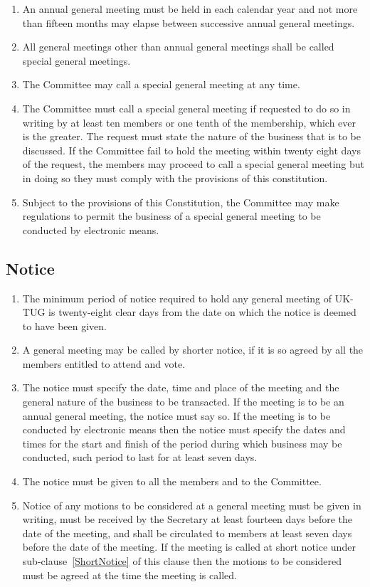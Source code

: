 \documentclass[a4paper,11pt]{article}
\begin{document}
\begin{enumerate}
\item An annual general meeting must be held in each calendar year and not
  more than fifteen months may elapse between successive annual general
  meetings.
\item All general meetings other than annual general meetings shall be called
  special general meetings.
\item The Committee may call a special general meeting at any time.
\item The Committee must call a special general meeting if requested to do so in
  writing by at least ten members or one tenth of the membership, which ever is
  the greater. The request must state the nature of the business that is to be
  discussed. If the Committee fail to hold the meeting within twenty eight days
  of the request, the members may proceed to call a special general meeting but
  in doing so they must comply with the provisions of this constitution.
\item Subject to the provisions of this Constitution, the Committee may make 
  regulations to permit the business of a special general meeting to be
  conducted by electronic means.
\end{enumerate}

\subsection{Notice}

\begin{enumerate}
\item The minimum period of notice required to hold any general meeting of
  UK-TUG is twenty-eight clear days from the date on which the notice is deemed to
  have been given.
\item \label{ShortNotice} A general meeting may be called by shorter notice, 
  if it is so agreed by all the members entitled to attend and vote.
\item The notice must specify the date, time and place of the meeting and the
  general nature of the business to be transacted. If the meeting is to be an
  annual general meeting, the notice must say so. If the meeting is to be conducted
  by electronic means then the notice must specify the dates and times for the
  start and finish of the period during which business may be conducted, such period to
  last for at least seven days.
\item The notice must be given to all the members and to the Committee.
\item Notice of any motions to be considered at a general meeting must be given
  in writing, must be received by
  the Secretary at least fourteen days before the date of the meeting, and shall be 
  circulated to members at least seven days before the date of the meeting. If the
  meeting is called at short notice under sub-clause~\ref{ShortNotice} of this clause 
  then the motions to be considered must be agreed at the time the meeting is called. 
\end{enumerate}
\end{document}
